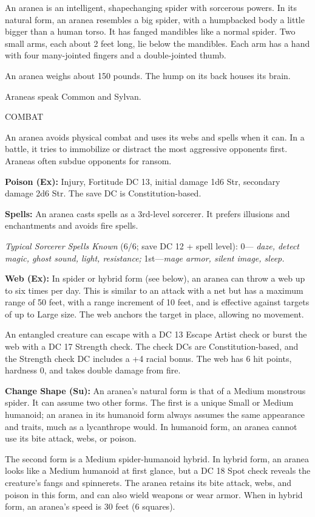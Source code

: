 \documentclass{article}
\begin{document}
An aranea is an intelligent, shapechanging spider with sorcerous powers. In its 
natural form, an aranea resembles a big spider, with a humpbacked body a little 
bigger than a human torso. It has fanged mandibles like a normal spider. Two small 
arms, each about 2 feet long, lie below the mandibles. Each arm has a hand with 
four many-jointed fingers and a double-jointed thumb.

An aranea weighs about 150 pounds. The hump on its back houses its brain.

Araneas speak Common and Sylvan.

COMBAT

An aranea avoids physical combat and uses its webs and spells when it can. In a 
battle, it tries to immobilize or distract the most aggressive opponents first. 
Araneas often subdue opponents for ransom.

\textbf{Poison (Ex):} Injury, Fortitude DC 13, initial damage 1d6 Str, secondary 
damage 2d6 Str. The save DC is Constitution-based.

\textbf{Spells:} An aranea casts spells as a 3rd-level sorcerer. It prefers illusions 
and enchantments and avoids fire spells.

\textit{Typical Sorcerer Spells Known }(6/6; save DC 12 + spell level): 0--- \textit{daze, 
detect magic, ghost sound, light, resistance; }1st---\textit{mage armor, silent 
image, sleep.}

\textbf{Web (Ex):} In spider or hybrid form (see below), an aranea can throw a 
web up to six times per day. This is similar to an attack with a net but has a 
maximum range of 50 feet, with a range increment of 10 feet, and is effective against 
targets of up to Large size. The web anchors the target in place, allowing no movement.

An entangled creature can escape with a DC 13 Escape Artist check or burst the 
web with a DC 17 Strength check. The check DCs are Constitution-based, and the 
Strength check DC includes a +4 racial bonus. The web has 6 hit points, hardness 
0, and takes double damage from fire.

\textbf{Change Shape (Su):} An aranea's natural form is that of a Medium monstrous 
spider. It can assume two other forms. The first is a unique Small or Medium humanoid; 
an aranea in its humanoid form always assumes the same appearance and traits, much 
as a lycanthrope would. In humanoid form, an aranea cannot use its bite attack, 
webs, or poison.

The second form is a Medium spider-humanoid hybrid. In hybrid form, an aranea looks 
like a Medium humanoid at first glance, but a DC 18 Spot check reveals the creature's 
fangs and spinnerets. The aranea retains its bite attack, webs, and poison in this 
form, and can also wield weapons or wear armor. When in hybrid form, an aranea's 
speed is 30 feet (6 squares).
\end{document}

